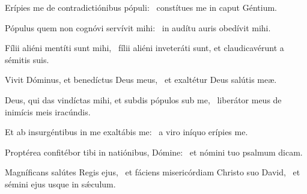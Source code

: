 \item Erípies me de contradictiónibus pópuli:~\psstar{} constítues me in caput Géntium.

\item Pópulus quem non cognóvi servívit mihi:~\psstar{} in audítu auris obedívit mihi.

\item Fílii aliéni mentíti sunt mihi,~\psstar{} fílii aliéni inveteráti sunt, et claudicavérunt a sémitis suis.

\item Vivit Dóminus, et benedíctus Deus meus,~\psstar{} et exaltétur Deus salútis meæ.

\item Deus, qui das vindíctas mihi, et subdis pópulos sub me,~\psstar{} liberátor meus de inimícis meis iracúndis.

\item Et ab insurgéntibus in me exaltábis me:~\psstar{} a viro iníquo erípies me.

\item Proptérea confitébor tibi in natiónibus, Dómine:~\psstar{} et nómini tuo psalmum dicam.

\item Magníficans salútes Regis ejus,~\pscross{} et fáciens misericórdiam Christo suo David,~\psstar{} et sémini ejus usque in sǽculum.